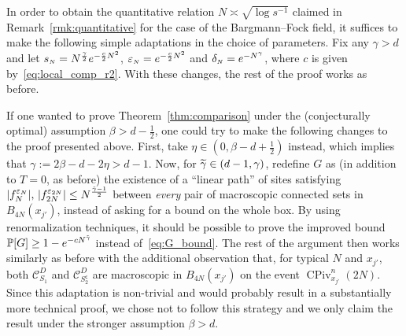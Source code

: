 \documentclass[AHL,Unicode,longabstracts,published]{cedram}
\DeclareMathOperator{\CPiv}{CPiv}
\renewcommand{\P}{\mathbb{P}}
\newcommand{\clC}{\mathcal{C}}
\newcommand{\sfc}{\mathsf{c}}
\newcommand{\si}[1]{{\mathchoice{}{}{\scriptscriptstyle}{}#1}}
\let\oldtilde\tilde
\renewcommand*{\tilde}[1]{\mathchoice{\widetilde{#1}}{\widetilde{#1}}{\oldtilde{#1}}{\oldtilde{#1}}}
\begin{document}
\begin{rema}\label{rmk:B-F_adapt}
In order to obtain the quantitative relation $N\asymp\sqrt{\log s^{-1}}$ claimed in Remark~\ref{rmk:quantitative} for the case of the Bargmann--Fock field, it suffices to make the following simple adaptations in the choice of parameters. Fix any $\gamma>d$ and let $s_{\si{N}}=N^{\frac{\gamma}{2}}e^{-\frac{c}{2} N^2}$, $\varepsilon_{\si{N}}=e^{-\frac{c}{2} N^2}$ and $\delta_{\si{N}}=e^{-N^{\gamma}}$, where $c$ is given by~\eqref{eq:local_comp_r2}. With these changes, the rest of the proof works as before.
\end{rema}

\begin{rema}\label{rmk:beta>d-1/2}
If one wanted to prove Theorem~\ref{thm:comparison} under the (conjecturally optimal) assumption $\beta>d-\frac12$, one could try to make the following changes to the proof presented above. First, take $\eta\in(0,\beta-d+\frac12)$ instead, which implies that $\gamma:=2\beta-d-2\eta>d-1$. Now, for $\tilde{\gamma}\in (d-1,\gamma)$, redefine $G$ as (in addition to $T=0$, as before) the existence of a ``linear path'' of sites satisfying $|f^{\varepsilon_N}_N|,\, |f^{\varepsilon_{2N}}_{2N}| \leq N^{\frac{\tilde{\gamma}-1}{2}}$ between \emph{every} pair of macroscopic connected sets in $B_{4N}(x_{j'})$, instead of asking for a bound on the whole box. By using renormalization techniques, it should be possible to prove the improved bound $\P[G]\geq 1-e^{-cN^{\tilde{\gamma}}}$ instead of~\eqref{eq:G_bound}. The rest of the argument then works similarly as before with the additional observation that, for typical $N$ and $x_{j'}$, both $\clC_{S_1}^D$ and $\clC_{S_2^{\sfc}}^D$ are macroscopic in $B_{4N}(x_{j'})$ on the event $\CPiv^n_{x_{j'}}(2N)$. Since this adaptation is non-trivial and would probably result in a substantially more technical proof, we chose not to follow this strategy and we only claim the result under the stronger assumption $\beta>d$.
\end{rema}
\end{document}
